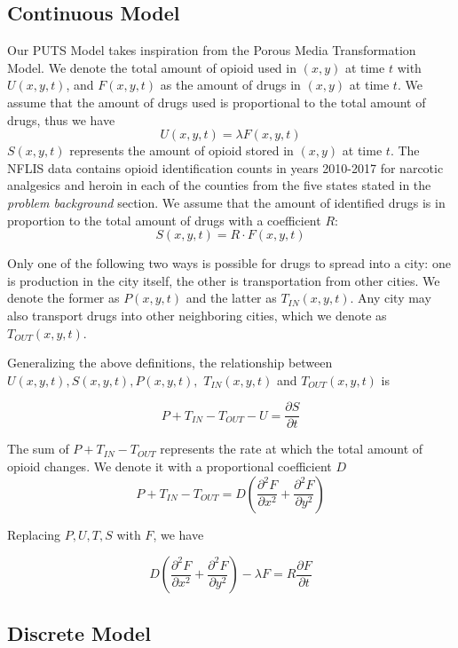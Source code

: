 \subsection{Continuous Model}
Our PUTS Model takes inspiration from the Porous Media Transformation Model.%
We denote the total amount of opioid used in $(x,y)$ at time $t$ with $U(x,y,t)$, and $F(x,y,t)$ as the amount of drugs in $(x,y)$ at time $t$. We assume that the amount of drugs used is proportional to the total amount of drugs, thus we have
\begin{equation}
U(x,y,t)=\lambda F(x,y,t)
\end{equation}
$S(x,y,t)$ represents the amount of opioid stored in $(x,y)$ at time $t$. The NFLIS data contains opioid identification counts in years 2010-2017 for narcotic analgesics and heroin in each of the counties from the five states stated in the \textit{problem background} section. We assume that the amount of identified drugs is in proportion to the total amount of drugs with a coefficient $R$:
\begin{equation}
S(x,y,t) = R\cdot F(x,y,t)
\end{equation}

Only one of the following two ways is possible for drugs to spread into a city: one is production in the city itself, the other is transportation from other cities. We denote the former as $P(x,y,t)$ and the latter as $T_{IN}(x,y,t)$. Any city may also transport drugs into other neighboring cities, which we denote as $T_{OUT}(x,y,t)$.

Generalizing the above definitions, the relationship between $U(x,y,t), S(x,y,t), P(x,y,t),$ $T_{IN}(x,y,t)$ and $T_{OUT}(x,y,t)$ is

\begin{equation}
P+T_{IN}-T_{OUT}-U=\frac{\partial S}{\partial t} 
\end{equation}

The sum of $P+T_{IN}-T_{OUT}$ represents the rate at which the total amount of opioid changes. We denote it with a proportional coefficient $D$
\begin{equation}
P+T_{IN}-T_{OUT} =D(\frac{\partial^2 F}{\partial x^2} + \frac{\partial^2 F}{\partial y^2})
\end{equation}

Replacing $P, U, T, S$ with $F$, we have

\begin{equation}
D(\frac{\partial^2 F}{\partial x^2} + \frac{\partial^2 F}{\partial y^2})- \lambda F =
R \frac{\partial F}{\partial t}
\end{equation}

 
\subsection{Discrete Model}